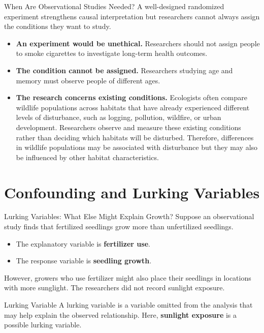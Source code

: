 \documentclass[aspectratio=169]{beamer}
\begin{document}
\begin{frame}{When Are Observational Studies Needed?}
A well-designed randomized experiment strengthens causal interpretation but researchers cannot always assign the conditions they want to study.

\begin{itemize}
	\item \textbf{An experiment would be unethical.} Researchers should not assign people to smoke cigarettes to investigate long-term health outcomes.
	\item \textbf{The condition cannot be assigned.} Researchers studying age and memory must observe people of different ages.
	\item \textbf{The research concerns existing conditions.} Ecologists often compare wildlife populations across habitats that have already experienced different levels of disturbance, such as logging, pollution, wildfire, or urban development. Researchers observe and measure these existing conditions rather than deciding which habitats will be disturbed. Therefore, differences in wildlife populations may be associated with disturbance but they may also be influenced by other habitat characteristics.
\end{itemize}
\end{frame}

\section{Confounding and Lurking Variables}

\begin{frame}{Lurking Variables: What Else Might Explain Growth?}
Suppose an observational study finds that fertilized seedlings grow more than unfertilized seedlings.

\begin{itemize}
	\item The explanatory variable is \textbf{fertilizer use}.
  	\item The response variable is \textbf{seedling growth}.
\end{itemize}

However, growers who use fertilizer might also place their seedlings in locations with more sunglight. The researchers did not record sunlight exposure.

\begin{block}{Lurking Variable}
A lurking variable is a variable omitted from the analysis that may help explain the observed relationship. Here, \textbf{sunlight exposure} is a possible lurking variable.
\end{block}
\end{frame}
\end{document}

